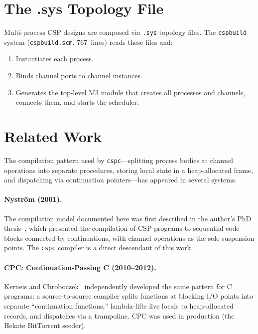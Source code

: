 \documentclass[11pt,letterpaper]{article}
\begin{document}
\section{The .sys Topology File}
\label{sec:sys}

Multi-process CSP designs are composed via \texttt{.sys} topology
files.  The \texttt{cspbuild} system (\texttt{cspbuild.scm},
767~lines) reads these files and:

\begin{enumerate}[nosep]
  \item Instantiates each process.
  \item Binds channel ports to channel instances.
  \item Generates the top-level M3 module that creates all processes
    and channels, connects them, and starts the scheduler.
\end{enumerate}

\section{Related Work}
\label{sec:related}

The compilation pattern used by \texttt{cspc}---splitting process
bodies at channel operations into separate procedures, storing
local state in a heap-allocated frame, and dispatching via
continuation pointers---has appeared in several systems.

\paragraph{Nystr\"om (2001).}
The compilation model documented here was first described in the
author's PhD thesis~\cite{nystrom2001}, which presented the
compilation of CSP programs to sequential code blocks connected
by continuations, with channel operations as the sole suspension
points.  The \texttt{cspc} compiler is a direct descendant of
this work.

\paragraph{CPC: Continuation-Passing C (2010--2012).}
Kerneis and Chroboczek~\cite{cpc2011} independently developed
the same pattern for C programs: a source-to-source compiler
splits functions at blocking I/O points into separate
``continuation functions,'' lambda-lifts live locals to
heap-allocated records, and dispatches via a trampoline.  CPC
was used in production (the Hekate BitTorrent seeder).
\end{document}
